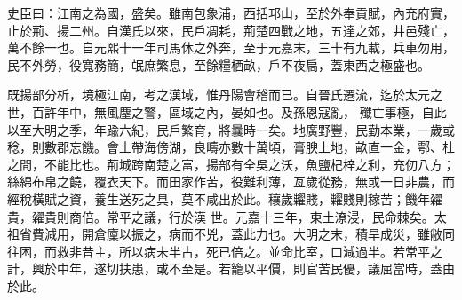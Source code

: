 \begin{pinyinscope}
 史臣曰：江南之為國，盛矣。雖南包象浦，西括邛山，至於外奉貢賦，內充府實，止於荊、揚二州。自漢氏以來，民戶凋耗，荊楚四戰之地，五達之郊，井邑殘亡，萬不餘一也。自元熙十一年司馬休之外奔，至于元嘉末，三十有九載，兵車勿用，民不外勞，役寬務簡，氓庶繁息，至餘糧栖畝，戶不夜扃，蓋東西之極盛也。



 既揚部分析，境極江南，考之漢域，惟丹陽會稽而已。自晉氏遷流，迄於太元之世，百許年中，無風塵之警，區域之內，晏如也。及孫恩寇亂，
 殲亡事極，自此以至大明之季，年踰六紀，民戶繁育，將曩時一矣。地廣野豐，民勤本業，一歲或稔，則數郡忘饑。會土帶海傍湖，良疇亦數十萬頃，膏腴上地，畝直一金，鄠、杜之間，不能比也。荊城跨南楚之富，揚部有全吳之沃，魚鹽杞梓之利，充仞八方；絲綿布帛之饒，覆衣天下。而田家作苦，役難利薄，亙歲從務，無或一日非農，而經稅橫賦之資，養生送死之具，莫不咸出於此。穰歲糶賤，糶賤則稼苦；饑年糴貴，糴貴則商倍。常平之議，行於漢
 世。元嘉十三年，東土潦浸，民命棘矣。太祖省費減用，開倉廩以振之，病而不兇，蓋此力也。大明之末，積旱成災，雖敝同往困，而救非昔主，所以病未半古，死已倍之。並命比室，口減過半。若常平之計，興於中年，遂切扶患，或不至是。若籠以平價，則官苦民優，議屈當時，蓋由於此。



\end{pinyinscope}